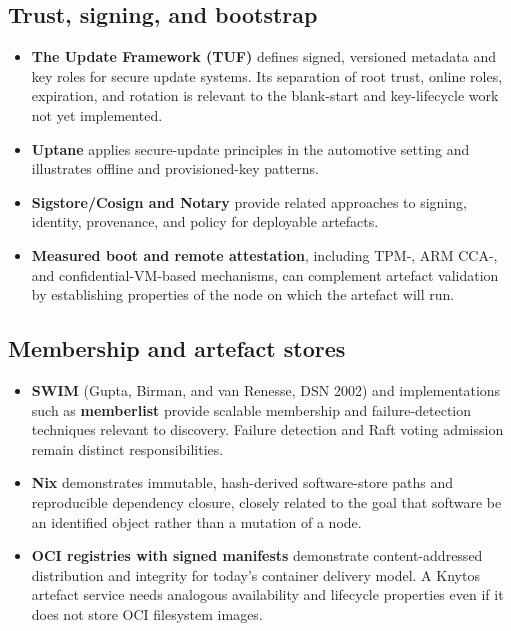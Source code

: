 \subsection{Trust, signing, and bootstrap}

\begin{itemize}
    \item \textbf{The Update Framework (TUF)} defines signed, versioned
        metadata and key roles for secure update systems. Its separation of
        root trust, online roles, expiration, and rotation is relevant to the
        blank-start and key-lifecycle work not yet implemented.

    \item \textbf{Uptane} applies secure-update principles in the automotive
        setting and illustrates offline and provisioned-key patterns.

    \item \textbf{Sigstore/Cosign and Notary} provide related approaches to
        signing, identity, provenance, and policy for deployable artefacts.

    \item \textbf{Measured boot and remote attestation}, including TPM-,
        ARM CCA-, and confidential-VM-based mechanisms, can complement
        artefact validation by establishing properties of the node on which
        the artefact will run.
\end{itemize}

\subsection{Membership and artefact stores}

\begin{itemize}
    \item \textbf{SWIM} (Gupta, Birman, and van Renesse, DSN 2002) and
        implementations such as \textbf{memberlist} provide scalable
        membership and failure-detection techniques relevant to discovery.
        Failure detection and Raft voting admission remain distinct
        responsibilities.

    \item \textbf{Nix} demonstrates immutable, hash-derived software-store
        paths and reproducible dependency closure, closely related to the
        goal that software be an identified object rather than a mutation of
        a node.

    \item \textbf{OCI registries with signed manifests} demonstrate
        content-addressed distribution and integrity for today's container
        delivery model. A Knytos artefact service needs analogous
        availability and lifecycle properties even if it does not store OCI
        filesystem images.
\end{itemize}

